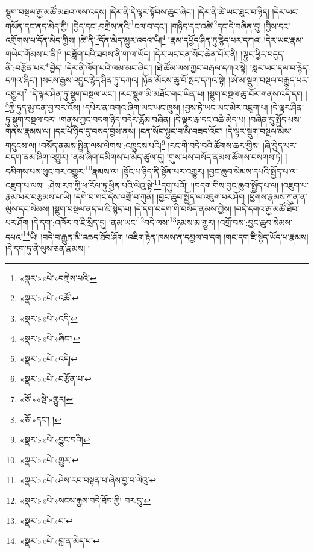 སྡུག་བསྔལ་རྒྱ་མཚོ་མཐའ་ལས་འདས། །དེར་ནི་དེ་ལྟར་སྟོབས་ཆུང་ཞིང་། །དེར་ནི་ཚེ་ཡང་ཐུང་བ་ཉིད། །དེར་ཡང་གསོན་དང་ནད་མེད་ཀྱི། །བྱེད་དང་:བཀྲེས་ནའི་\footnote{«སྣར་»«པེ་»བཀྲེས་པའི་}ངལ་བ་དང་། །གཉིད་དང་འཚེ་\footnote{«སྣར་»«པེ་»འཚོ་}དང་དེ་བཞིན་དུ། །བྱིས་དང་འགྲོགས་པ་དོན་མེད་ཀྱིས། །ཚེ་ནི་\footnote{«སྣར་»«པེ་»འདི་}དོན་མེད་མྱུར་འདའ་ཡི།\footnote{«སྣར་»«པེ་»ཞིང་།} །རྣམ་དཔྱོད་ཤིན་ཏུ་རྙེད་པར་དཀའ། །དེར་ཡང་རྣམ་གཡེང་གོམས་པ་ནི།\footnote{«སྣར་»«པེ་»འདི།} །བཟློག་པའི་ཐབས་ནི་ག་ལ་ཡོད། །དེར་ཡང་ངན་སོང་ཆེན་པོར་ནི། །ལྟུང་ཕྱིར་བདུད་ནི་:བརྩོན་པར་\footnote{«སྣར་»«པེ་»བརྩོན་པ་}བྱེད། །དེར་ནི་ལོག་པའི་ལམ་མང་ཞིང་། །ཐེ་ཚོམ་ལས་ཀྱང་བརྒལ་དཀའ་སྟེ། །སླར་ཡང་དལ་བ་རྙེད་དཀའ་ཞིང་། །སངས་རྒྱས་འབྱུང་རྙེད་ཤིན་ཏུ་དཀའ། །ཉོན་མོངས་ཆུ་བོ་སྤང་དཀའ་སྟེ། །ཨེ་མ་སྡུག་བསྔལ་བརྒྱུད་པར་འགྱུར།\footnote{«ཅོ་»«སྡེ་»གྱུར།} །དེ་ལྟར་ཤིན་ཏུ་སྡུག་བསྔལ་ཡང་། །རང་སྡུག་མི་མཐོང་གང་ཡིན་པ། །སྡུག་བསྔལ་ཆུ་བོར་གནས་འདི་དག །\footnote{«ཅོ་»དང་། །}ཀྱི་ཧུད་མྱ་ངན་བྱ་བར་འོས། །དཔེར་ན་འགའ་ཞིག་ཡང་ཡང་ཁྲུས། །བྱས་ཏེ་ཡང་ཡང་མེར་འཇུག་པ། །དེ་ལྟར་ཤིན་ཏུ་སྡུག་བསྔལ་བར། །གནས་ཀྱང་བདག་ཉིད་བདེར་རློམ་བཞིན། །དེ་ལྟར་རྒ་དང་འཆི་མེད་པ། །བཞིན་དུ་སྤྱོད་པས་གནས་རྣམས་ལ། །དང་པོ་ཉིད་དུ་བསད་བྱས་ནས། །ངན་སོང་ལྟུང་བ་མི་བཟད་འོང་། །དེ་ལྟར་སྡུག་བསྔལ་མེས་གདུངས་ལ། །བསོད་ནམས་སྤྲིན་ལས་ལེགས་:འཁྲུངས་པའི།\footnote{«སྣར་»«པེ་»བྱུང་བའི།} །རང་གི་བདེ་བའི་ཚོགས་ཆར་གྱིས། །ཞི་བྱེད་པར་བདག་ནམ་ཞིག་འགྱུར། །ནམ་ཞིག་དམིགས་པ་མེད་ཚུལ་དུ། །གུས་པས་བསོད་ནམས་ཚོགས་བསགས་ཏེ། །དམིགས་པས་ཕུང་བར་འགྱུར་\footnote{«སྣར་»«པེ་»གྱུར་}རྣམས་ལ། །སྟོང་པ་ཉིད་ནི་སྟོན་པར་འགྱུར། །བྱང་ཆུབ་སེམས་དཔའི་སྤྱོད་པ་ལ་འཇུག་པ་ལས། :ཤེས་རབ་ཀྱི་ཕ་རོལ་ཏུ་ཕྱིན་པའི་ལེའུ་སྟེ་\footnote{«སྣར་»«པེ་»ཤེས་རབ་བསྟན་པ་ཞེས་བྱ་བ་ལེའུ་}དགུ་པའོ།། །།བདག་གིས་བྱང་ཆུབ་སྤྱོད་པ་ལ། །འཇུག་པ་རྣམ་པར་བརྩམས་པ་ཡི། །དགེ་བ་གང་དེས་འགྲོ་བ་ཀུན། །བྱང་ཆུབ་སྤྱོད་ལ་འཇུག་པར་ཤོག །ཕྱོགས་རྣམས་ཀུན་ན་ལུས་དང་སེམས། །སྡུག་བསྔལ་ནད་པ་ཇི་སྙེད་པ། །དེ་དག་བདག་གི་བསོད་ནམས་ཀྱིས། །བདེ་དགའ་རྒྱ་མཚོ་ཐོབ་པར་ཤོག །དེ་དག་:འཁོར་བ་ཇི་སྲིད་དུ། །ནམ་ཡང་\footnote{«སྣར་»«པེ་»སངས་རྒྱས་བདེ་ཐོབ་ཀྱི། བར་དུ་}བདེ་ལས་\footnote{«སྣར་»«པེ་»བ་}ཉམས་མ་གྱུར། །འགྲོ་བས་:བྱང་ཆུབ་སེམས་དཔའ་\footnote{«སྣར་»«པེ་»བླ་ན་མེད་པ་}ཡི། །བདེ་བ་རྒྱུན་མི་འཆད་ཐོབ་ཤོག །འཇིག་རྟེན་ཁམས་ན་དམྱལ་བ་དག །གང་དག་ཇི་སྙེད་ཡོད་པ་རྣམས། །དེ་དག་ཏུ་ནི་ལུས་ཅན་རྣམས། །
